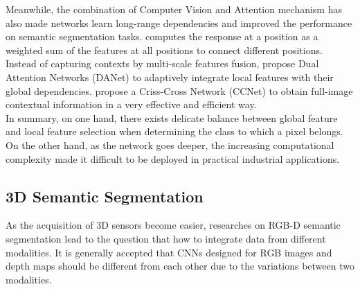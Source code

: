 ﻿\documentclass[journal]{IEEEtran}
\begin{document}
 
    Meanwhile, the combination of Computer Vision and Attention mechanism has also made networks learn long-range dependencies and improved the performance on semantic segmentation tasks. \cite{NonLocal2018} computes the response at a position as a weighted sum of the features at all positions to connect different positions. Instead of capturing contexts by multi-scale features fusion, \cite{fu2019dual} propose Dual Attention Networks (DANet) to adaptively integrate local features with their global dependencies. \cite{huang2018ccnet} propose a Criss-Cross Network (CCNet) to obtain full-image contextual information in a very effective and efficient way. \\   
    
 
    In summary, on one hand, there exists delicate balance between global feature and local feature selection when determining the class to which a pixel belongs. On the other hand, as the network goes deeper, the increasing computational complexity made it difficult to be deployed in practical industrial applications.
    
\subsection{3D Semantic Segmentation}
 
    As the acquisition of 3D sensors become easier, researches on RGB-D semantic segmentation\cite{wang2021brief} lead to the question that how to integrate data from different modalities.  It is generally accepted that CNNs designed for RGB images and depth maps should be different from each other due to the variations between two modalities. 
\end{document}
